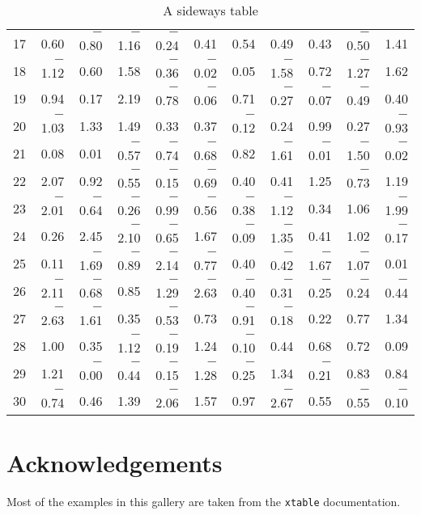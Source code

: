 \documentclass[letterpaper]{article}
\begin{document}
\begin{Schunk}
\begin{sidewaystable}[ht]
\begin{center}
\begin{tabular}{rrrrrrrrrrr}
  17 & 0.60 & $-$0.80 & $-$1.16 & $-$0.24 & 0.41 & 0.54 & 0.49 & 0.43 & $-$0.50 & 1.41 \\
  18 & $-$1.12 & 0.60 & 1.58 & $-$0.36 & $-$0.02 & 0.05 & $-$1.58 & 0.72 & $-$1.27 & 1.62 \\
  19 & 0.94 & 0.17 & 2.19 & $-$0.78 & $-$0.06 & 0.71 & $-$0.27 & $-$0.07 & $-$0.49 & 0.40 \\
  20 & $-$1.03 & 1.33 & 1.49 & 0.33 & 0.37 & $-$0.12 & 0.24 & 0.99 & 0.27 & $-$0.93 \\
  21 & 0.08 & 0.01 & $-$0.57 & $-$0.74 & $-$0.68 & 0.82 & $-$1.61 & $-$0.01 & $-$1.50 & $-$0.02 \\
  22 & 2.07 & 0.92 & $-$0.55 & $-$0.15 & $-$0.69 & 0.40 & 0.41 & 1.25 & $-$0.73 & 1.19 \\
  23 & $-$2.01 & $-$0.64 & $-$0.26 & $-$0.99 & $-$0.56 & $-$0.38 & $-$1.12 & 0.34 & 1.06 & $-$1.99 \\
  24 & 0.26 & 2.45 & $-$2.10 & $-$0.65 & 1.67 & $-$0.09 & $-$1.35 & 0.41 & 1.02 & $-$0.17 \\
  25 & 0.11 & $-$1.69 & $-$0.89 & $-$2.14 & $-$0.77 & 0.40 & $-$0.42 & $-$1.67 & $-$1.07 & 0.01 \\
  26 & $-$2.11 & $-$0.68 & 0.85 & $-$1.29 & $-$2.63 & $-$0.40 & $-$0.31 & $-$0.25 & $-$0.24 & $-$0.44 \\
  27 & $-$2.63 & $-$1.61 & 0.35 & $-$0.53 & 0.73 & $-$0.91 & $-$0.18 & 0.22 & 0.77 & 1.34 \\
  28 & 1.00 & 0.35 & $-$1.12 & $-$0.19 & 1.24 & $-$0.10 & 0.44 & 0.68 & 0.72 & 0.09 \\
  29 & 1.21 & $-$0.00 & $-$0.44 & $-$0.15 & $-$1.28 & $-$0.25 & 1.34 & $-$0.21 & 0.83 & 0.84 \\
  30 & $-$0.74 & 0.46 & 1.39 & $-$2.06 & 1.57 & 0.97 & $-$2.67 & 0.55 & $-$0.55 & $-$0.10 \\
   \hline
\end{tabular}
\caption{A sideways table}
\label{tabsmall}
\end{center}
\end{sidewaystable}\end{Schunk}
\clearpage

\section{Acknowledgements}
Most of the examples in this gallery are taken from the {\tt xtable} documentation.
\end{document}

